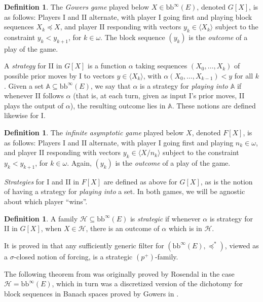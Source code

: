 \documentclass[11pt]{amsart}
\newcommand{\A}{\mathbb{A}}
\theoremstyle{definition}
\newtheorem{defn}[thm]{Definition}
\theoremstyle{remark}
\newcommand{\LH}{\mathcal{H}}
\newcommand{\bb}{\mathrm{bb}}
\renewcommand{\1}{\mathbf{1}}
\begin{document}

\begin{defn}
	The \emph{Gowers game} \cite{MR1954235} played below $X\in\bb^\infty(E)$, denoted $G[X]$, is as follows: Players I and II alternate, with player I going first and playing block sequences $X_k\preceq X$, and player II responding with vectors $y_k\in \langle X_k\rangle$ subject to the constraint $y_k<y_{k+1}$, for $k\in\omega$. The block sequence $(y_k)$ is the \emph{outcome} of a play of the game.
\end{defn}

	A \emph{strategy} for II in $G[X]$ is a function $\alpha$ taking sequences $(X_0,\ldots,X_k)$ of possible prior moves by I to vectors $y\in \langle X_{k}\rangle$, with $\alpha(X_0,\ldots,X_{k-1})<y$ for all $k$. Given a set $\A\subseteq\bb^\infty(E)$, we say that $\alpha$ is a strategy for \emph{playing into $\A$} if whenever II follows $\alpha$ (that is, at each turn, given as input I's prior moves, II plays the output of $\alpha$), the resulting outcome lies in $\A$. These notions are defined likewise for I.

\begin{defn}
	The \emph{infinite asymptotic game} \cite{MR2566964} \cite{MR2604856} played below $X$, denoted $F[X]$, is as follows: Players I and II alternate, with player I going first and playing $n_k\in\omega$, and player II responding with vectors $y_k\in \langle X/n_k\rangle$ subject to the constraint $y_k<y_{k+1}$, for $k\in\omega$. Again, $(y_k)$ is the \emph{outcome} of a play of the game.	
\end{defn}

\emph{Strategies} for I and II in $F[X]$ are defined as above for $G[X]$, as is the notion of having a strategy for \emph{playing into} a set. In both games, we will be agnostic about which player ``wins''.

\begin{defn}
	A family $\LH\subseteq\bb^\infty(E)$ is \emph{strategic} if whenever $\alpha$ is strategy for II in $G[X]$, when $X\in\LH$, there is an outcome of $\alpha$ which is in $\LH$.	
\end{defn}

It is proved in \cite{MR3864398} that any sufficiently generic filter for $(\bb^\infty(E),\preceq^*)$, viewed as a $\sigma$-closed notion of forcing, is a strategic $(p^+)$-family.

The following theorem from \cite{MR3864398} was originally proved by Rosendal \cite{MR2604856} in the case $\LH=\bb^\infty(E)$, which in turn was a discretized version of the dichotomy for block sequences in Banach spaces proved by Gowers in \cite{MR1954235}.
\end{document}
